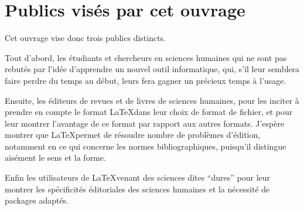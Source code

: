 \section{Publics visés par cet ouvrage}

Cet ouvrage vise donc trois publics distincts.

Tout d'abord, les étudiants et chercheurs en sciences humaines qui ne sont pas rebutés par l'idée d'apprendre un nouvel outil informatique, qui, s'il leur semblera faire perdre du temps au début, leurs fera gagner un précieux temps à l'usage.

Ensuite, les éditeurs de revues et de livres de sciences humaines, pour les inciter à prendre en compte le format \LaTeX dans leur choix de format de fichier, et pour leur montrer l'avantage de ce format par rapport aux autres formats. J'espère montrer que \LaTeX permet de résoudre nombre de problèmes d'édition, notamment en ce qui concerne les normes bibliographiques, puisqu'il distingue aisément le sens et la forme.

Enfin les utilisateurs de \LaTeX venant des sciences dites \enquote{dures} pour leur montrer les spécificités éditoriales des sciences humaines et la nécessité de packages adaptés.

